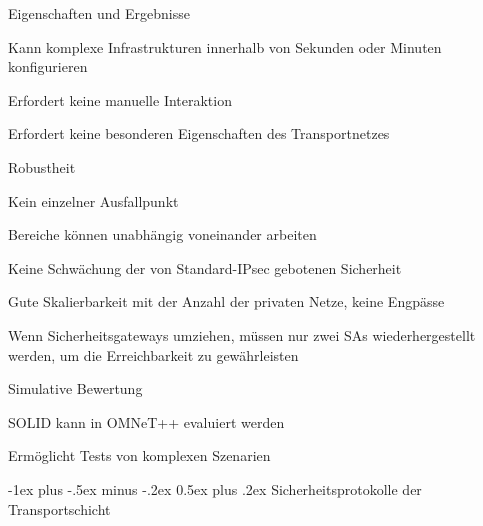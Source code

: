 \documentclass[a4paper]{article}
\makeatletter
\renewcommand{\section}{\@startsection{section}{1}{0mm}%
 {-1ex plus -.5ex minus -.2ex}%
 {0.5ex plus .2ex}%
 {\normalfont\large\bfseries}}
\makeatother
\begin{document}
\begin{multicols}{3}
      Eigenschaften und Ergebnisse
      \begin{itemize*}
            \item Kann komplexe Infrastrukturen innerhalb von Sekunden oder Minuten konfigurieren
            \item Erfordert keine manuelle Interaktion
            \item Erfordert keine besonderen Eigenschaften des Transportnetzes
            \item Robustheit
            \begin{itemize*}
                  \item Kein einzelner Ausfallpunkt
                  \item Bereiche können unabhängig voneinander arbeiten
            \end{itemize*}
            \item Keine Schwächung der von Standard-IPsec gebotenen Sicherheit
            \item Gute Skalierbarkeit mit der Anzahl der privaten Netze, keine Engpässe
            \item Wenn Sicherheitsgateways umziehen, müssen nur zwei SAs wiederhergestellt werden, um die Erreichbarkeit zu gewährleisten
      \end{itemize*}

      Simulative Bewertung
      \begin{itemize*}
            \item SOLID kann in OMNeT++ evaluiert werden
            \item Ermöglicht Tests von komplexen Szenarien
      \end{itemize*}
      \columnbreak

      \section{Sicherheitsprotokolle der Transportschicht}

\end{multicols}
\end{document}
